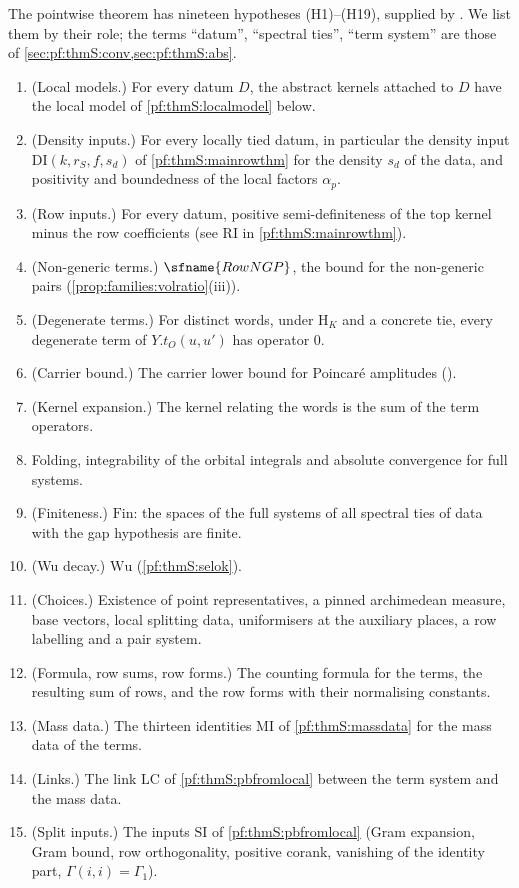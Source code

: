 The pointwise theorem has nineteen hypotheses (H1)--(H19), supplied by
. We list them by their role; the terms ``datum'',
``spectral ties'', ``term system'' are those of \cref{sec:pf:thmS:conv,sec:pf:thmS:abs}.
\begin{enumerate}[label=(H\arabic*)]
\item\label{pf:thmS:H1} (Local models.) For every datum $D$, the abstract kernels attached to $D$ have the local
model of \cref{pf:thmS:localmodel} below.
\item (Density inputs.) For every locally tied datum, in particular the density input
$\mathrm{DI}(k,r_S,f,s_d)$ of \cref{pf:thmS:mainrowthm} for the density $s_d$ of the data, and positivity and
boundedness of the local factors $\alpha_p$.
\item (Row inputs.) For every datum, positive semi-definiteness of the top kernel minus the row coefficients
(see $\mathrm{RI}$ in \cref{pf:thmS:mainrowthm}).
\item (Non-generic terms.) $\sfname{RowNGP}$, the bound for the non-generic pairs (\cref{prop:families:volratio}(iii)).
\item (Degenerate terms.) For distinct words, under $\mathrm{H}_{K}$ and a concrete tie, every degenerate term
of $Y.t_O(u,u')$ has operator $0$.
\item (Carrier bound.) The carrier lower bound for Poincar\'e amplitudes ().
\item (Kernel expansion.) The kernel relating the words is the sum of the term operators.
\item[(H8--10)] Folding, integrability of the orbital integrals and absolute convergence for full systems.
\item[(H11)] (Finiteness.) $\mathrm{Fin}$: the spaces of the full systems of all spectral ties of data with the gap hypothesis are finite.
\item[(H12)] (Wu decay.) $\mathrm{Wu}$ (\cref{pf:thmS:selok}).
\item[(H13)] (Choices.) Existence of point representatives, a pinned archimedean measure, base vectors,
local splitting data, uniformisers at the auxiliary places, a row labelling and a pair system.
\item[(H14--16)] (Formula, row sums, row forms.) The counting formula for the terms,
the resulting sum of rows, and the row forms with their normalising constants.
\item[(H17)] (Mass data.) The thirteen identities $\mathrm{MI}$ of \cref{pf:thmS:massdata} for the
mass data of the terms.
\item[(H18)] (Links.) The link $\mathrm{LC}$ of \cref{pf:thmS:pbfromlocal} between the term system and the
mass data.
\item[(H19)] (Split inputs.) The inputs $\mathrm{SI}$ of \cref{pf:thmS:pbfromlocal} (Gram expansion, Gram
bound, row orthogonality, positive corank, vanishing of the identity part, $\Gamma(i,i)=\Gamma_1$).
\end{enumerate}

